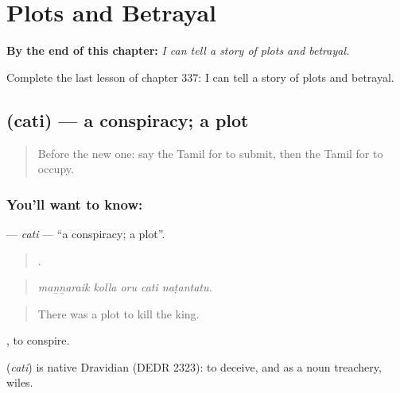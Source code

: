 
\chapter{Plots and Betrayal}
\label{ch:ta-plots-and-betrayal}

\begin{chapteropening}
\textbf{By the end of this chapter:} \emph{I can tell a story of plots and betrayal.}

Complete the last lesson of chapter 337: I can tell a story of plots and betrayal.
\end{chapteropening}

\section[\texorpdfstring{\ta{சதி} (cati)}{சதி (cati)}]{ (cati) — a conspiracy; a plot}

\label{lesson:TA-C337-cati}



\begin{quote}
Before the new one: say the Tamil for to submit, then the Tamil for to occupy.
\end{quote}

\subsection*{You'll want to know: }
\textbf{} — \emph{cati} — \textquotedblleft{}a conspiracy; a plot\textquotedblright{}.

\begin{quote}
    .
\end{quote}

\begin{quote}
\emph{maṉṉaraik kolla oru cati naṭantatu.}
\end{quote}

\begin{quote}
There was a plot to kill the king.
\end{quote}

 , to conspire.

\begin{cousinweb}
\textbf{} (\emph{cati}) is native Dravidian (DEDR 2323): to deceive, and as a noun treachery, wiles.
\end{cousinweb}

